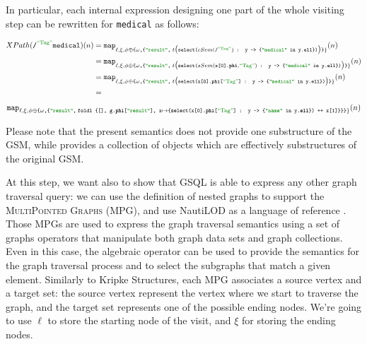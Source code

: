 \begin{example}
In particular, each internal expression designing one part of the whole visiting step can be rewritten for \texttt{medical} as follows:

\hspace*{-1.5cm}\vbox{\[\begin{split}
XPath(\texttt{/}^{\mstr{Tag}}\texttt{medical})(n)&=\texttt{map}_{\ell,\xi,\phi\oplus\texttt{\{}\omega\texttt{,\{\mstr{result},}\;t\big(\texttt{select(} cSem(\texttt{/}^{\mstr{Tag}}) \texttt{ : y -> \{\mstr{medical} in y.\textbf{ell}\})}\big)\texttt{\}}\}}(n)\\
	&=\texttt{map}_{\ell,\xi,\phi\oplus\texttt{\{}\omega\texttt{,\{\mstr{result},}\;t\big(\texttt{select(} sSem(\texttt{x[0].\textbf{phi}},\mstr{Tag}) \texttt{ : y -> \{\mstr{medical} in y.\textbf{ell}\})}\big)\texttt{\}}\}}(n)\\
	&=\texttt{map}_{\ell,\xi,\phi\oplus\texttt{\{}\omega\texttt{,\{\mstr{result},}\;t\big(\texttt{select(} \texttt{x[0].\textbf{phi}[}\mstr{Tag}\texttt{]} \texttt{ : y -> \{\mstr{medical} in y.\textbf{ell}\})}\big)\texttt{\}}\}}(n)\\
	&=\\
\end{split}\]
\[\texttt{map}_{\ell,\xi,\phi\oplus\texttt{\{}\omega\texttt{,\{\mstr{result},\;foldl \{[], g.\textbf{phi}[\mstr{result}], x}\mapsto\texttt{\{}\texttt{select(} \texttt{x[0].\textbf{phi}[}\mstr{Tag}\texttt{]} \texttt{ : y -> \{\mstr{name} in y.\textbf{ell}\})}\texttt{ ++ x[1]\}\}\}}\}}(n)\]}
\end{example}

Please note that the present semantics does not provide one substructure  of the GSM, while provides a collection of objects which are effectively substructures of the original GSM.

\label{ph:NTLImpl}
At this step, we want also to show that GSQL   is able to express any other graph traversal query: we can use the definition of nested graphs  to support the \textsc{MultiPointed Graphs} (MPG), and use NautiLOD as a language of reference \cite{NautiLOD}. Those MPGs are used to express the graph traversal semantics using a set of graphs operators that manipulate both graph data sets and graph collections. Even in this case, the algebraic operator can be used to provide the semantics for the graph traversal process and to select the subgraphs that match a given element. Similarly to Kripke Structures, each MPG associates  a source vertex and a target set: the source vertex represent the vertex where we start to traverse the graph, and the target set represents one of the possible ending nodes. We're going to use $\ell$ to store the starting node of the visit, and $\xi$ for storing the ending nodes. 

